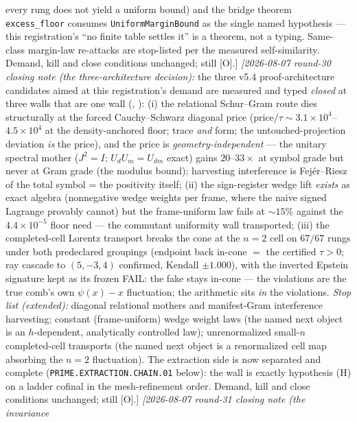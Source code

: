\documentclass[11pt,a4paper]{article}
\begin{document}
{every rung does not yield a uniform bound) and the bridge
theorem \texttt{excess\_floor} consumes
\texttt{UniformMarginBound} as the single named hypothesis ---
this registration's ``no finite table settles it'' is a theorem,
not a typing.  Same-class margin-law re-attacks are stop-listed
per the measured self-similarity.  Demand, kill and close
conditions unchanged; still [O].]
\emph{[2026-08-07 round-30 closing note (the three-architecture
decision):} the three v5.4 proof-architecture candidates aimed at
this registration's demand are measured and typed \emph{closed}
at three walls that are one wall
(,
): (i) the relational
Schur--Gram route dies structurally at the forced Cauchy--Schwarz
diagonal price (price$/\tau \sim 3.1\times10^4$--$4.5\times10^4$
at the density-anchored floor; trace \emph{and} form; the
untouched-projection deviation \emph{is} the price), and the
price is \emph{geometry-independent} --- the unitary spectral
mother ($J^2 = I$; $U_dU_m = U_{dm}$ exact) gains $20$--$33\times$
at symbol grade but never at Gram grade (the modulus bound);
harvesting interference is Fej\'er--Riesz of the total symbol =
the positivity itself; (ii) the sign-register wedge lift
\emph{exists} as exact algebra (nonnegative wedge weights per
frame, where the naive signed Lagrange provably cannot) but the
frame-uniform law fails at ${\sim}15\%$ against the
$4.4\times10^{-5}$ floor need --- the commutant uniformity wall
transported; (iii) the completed-cell Lorentz transport breaks
the cone at the $n = 2$ cell on $67/67$ rungs under both
predeclared groupings (endpoint back in-cone $=$ the certified
$\tau > 0$; ray cascade to $(5,-3,4)$ confirmed, Kendall
$\pm1.000$), with the inverted Epstein signature kept as its
frozen FAIL: the fake stays in-cone --- the violations are the
true comb's own $\psi(x) - x$ fluctuation; the arithmetic sits
\emph{in} the violations.  \emph{Stop list (extended):} diagonal
relational mothers and manifest-Gram interference harvesting;
constant (frame-uniform) wedge weight laws (the named next
object is an $h$-dependent, analytically controlled law);
unrenormalized small-$n$ completed-cell transports (the named
next object is a renormalized cell map absorbing the $n = 2$
fluctuation).  The extraction side is now separated and complete
(\texttt{PRIME.EXTRACTION.CHAIN.01} below): the wall is exactly
hypothesis (H) on a ladder cofinal in the mesh-refinement
order.  Demand, kill and close
conditions unchanged; still [O].]
\emph{[2026-08-07 round-31 closing note (the invariance
}}
\end{document}
